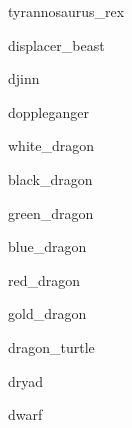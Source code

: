 \documentclass[letterpaper,serif]{module}
\begin{document}
\begin{newmonster}{tyrannosaurus_rex}\end{newmonster}

\begin{newmonster}{displacer_beast}\end{newmonster}

\begin{newmonster}{djinn}\end{newmonster}

\begin{newmonster}{doppleganger}\end{newmonster}


\begin{newmonster}{white_dragon}\end{newmonster}

\begin{newmonster}{black_dragon}\end{newmonster}

\begin{newmonster}{green_dragon}\end{newmonster}

\begin{newmonster}{blue_dragon}\end{newmonster}

\begin{newmonster}{red_dragon}\end{newmonster}

\begin{newmonster}{gold_dragon}\end{newmonster}

\begin{newmonster}{dragon_turtle}\end{newmonster}

\begin{newmonster}{dryad}\end{newmonster}

\begin{newmonster}{dwarf}\end{newmonster}
\end{document}
